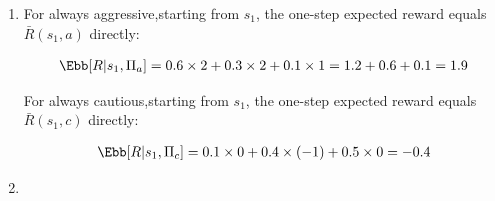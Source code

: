 \documentclass[12pt, xcolor=dvipsnames,svgnames,x11names]{article}
\begin{document}
\begin{enumerate}
\begin{align*}
\bar{R}(s_2, a) & = \sum_{s'} P(s'|s_2,a)R(s_2,a,s')\\
				& P(s_0|s_2,a)R(s_2,a,s_0) + P(s_1|s_2,a)R(s_2,a,s_1) + P(s_2|s_2,a)R(s_2,a,s_2)\\
				& =  0.3\times 2 + 0.7\times 1  = 0.6 + 0.7 = 1.3
\end{align*}


For state $s_2$, $\bar{R}(s_2, a) > \bar{R}(s_2, c)$, so aggresive action is preferred. 


\item 


For always aggressive,starting from $s_1$, the one-step expected reward equals $\bar{R}(s_1, a)$  directly:

\begin{align*}
\Ebb[R | s_1, \Pi_a] = 0.6\times 2 + 0.3 \times 2 + 0.1 \times 1 = 1.2 + 0.6 + 0.1 = 1.9
\end{align*}

For always cautious,starting from $s_1$, the one-step expected reward equals $\bar{R}(s_1, c)$  directly:

\begin{align*}
\Ebb[R | s_1, \Pi_c] = 0.1\times 0 + 0.4 \times (-1) + 0.5 \times 0 = -0.4
\end{align*}


\item 



\end{enumerate}
\end{document}
